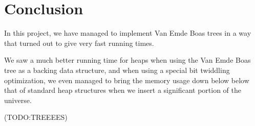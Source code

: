 \section{Conclusion}

In this project, we have managed to implement Van Emde Boas trees in a way that turned out to give very fast running times.

We saw a much better running time for heaps when using the Van Emde Boas tree as a backing data structure, and when using a special bit twiddling optimization, we even managed to bring the memory usage down below below that of standard heap structures when we insert a significant portion of the universe.

(TODO:TREEEES)